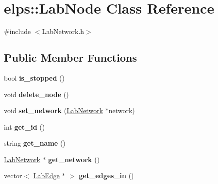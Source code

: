 \hypertarget{classelps_1_1_lab_node}{\section{elps\+:\+:Lab\+Node Class Reference}
\label{classelps_1_1_lab_node}
}


{\ttfamily \#include $<$Lab\+Network.\+h$>$}

\subsection*{Public Member Functions}
\begin{DoxyCompactItemize}
\item 
\hypertarget{classelps_1_1_lab_node_ac74fe590b62b45cb772cc3d66fc4c7ca}{bool {\bfseries is\+\_\+stopped} ()}\label{classelps_1_1_lab_node_ac74fe590b62b45cb772cc3d66fc4c7ca}

\item 
\hypertarget{classelps_1_1_lab_node_a5c770fe0172711cb036d1356f6d0d237}{void {\bfseries delete\+\_\+node} ()}\label{classelps_1_1_lab_node_a5c770fe0172711cb036d1356f6d0d237}

\item 
\hypertarget{classelps_1_1_lab_node_a3973c47ab60163af0733173761ecddcb}{void {\bfseries set\+\_\+network} (\hyperlink{classelps_1_1_lab_network}{Lab\+Network} $\ast$network)}\label{classelps_1_1_lab_node_a3973c47ab60163af0733173761ecddcb}

\item 
\hypertarget{classelps_1_1_lab_node_a2ed412f2010d6897192e68b98c7fce0b}{int {\bfseries get\+\_\+id} ()}\label{classelps_1_1_lab_node_a2ed412f2010d6897192e68b98c7fce0b}

\item 
\hypertarget{classelps_1_1_lab_node_aadf4ed88a3ae4c643849d801502d1feb}{string {\bfseries get\+\_\+name} ()}\label{classelps_1_1_lab_node_aadf4ed88a3ae4c643849d801502d1feb}

\item 
\hypertarget{classelps_1_1_lab_node_a23dd58cab5821c32b8b7cabda3b211d1}{\hyperlink{classelps_1_1_lab_network}{Lab\+Network} $\ast$ {\bfseries get\+\_\+network} ()}\label{classelps_1_1_lab_node_a23dd58cab5821c32b8b7cabda3b211d1}

\item 
\hypertarget{classelps_1_1_lab_node_ad3b05ff81030447d7b77ccf92904c5e9}{vector$<$ \hyperlink{classelps_1_1_lab_edge}{Lab\+Edge} $\ast$ $>$ {\bfseries get\+\_\+edges\+\_\+in} ()}\label{classelps_1_1_lab_node_ad3b05ff81030447d7b77ccf92904c5e9}


\end{DoxyCompactItemize}
